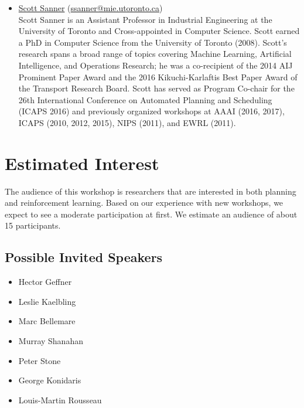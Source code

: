 \documentclass[10pt]{article}
\begin{document}
\begin{itemize}
\item \href{http://d3m.mie.utoronto.ca}{Scott Sanner}
  (\href{mailto:ssanner@mie.utoronto.ca}{ssanner@mie.utoronto.ca})\\
Scott Sanner is an Assistant Professor in Industrial Engineering at the
University of Toronto and Cross-appointed in Computer Science.  Scott earned a
PhD in Computer Science from the University of Toronto (2008).  Scott’s research
spans a broad range of topics covering Machine Learning, Artificial
Intelligence, and Operations Research; he was a co-recipient of the 2014 AIJ
Prominent Paper Award and the 2016 Kikuchi-Karlaftis Best Paper Award of the
Transport Research Board.  Scott has served as Program Co-chair for the 26th
International Conference on Automated Planning and Scheduling (ICAPS 2016) and
previously organized workshops at AAAI (2016, 2017), ICAPS (2010, 2012, 2015),
NIPS (2011), and EWRL (2011).




  
\end{itemize}

\section*{Estimated Interest}

The audience of this workshop is researchers that are interested in both
planning and reinforcement learning.
%
Based on our experience with new workshops, we expect to see a moderate
participation at first. We estimate an audience of about 15 participants.  

\subsection*{Possible Invited Speakers}

\begin{itemize}
  \item Hector Geffner
  \item Leslie Kaelbling
  \item Marc Bellemare
  \item Murray Shanahan
  \item Peter Stone
  \item George Konidaris
  \item Louis-Martin Rousseau %
\end{itemize}
\end{document}
